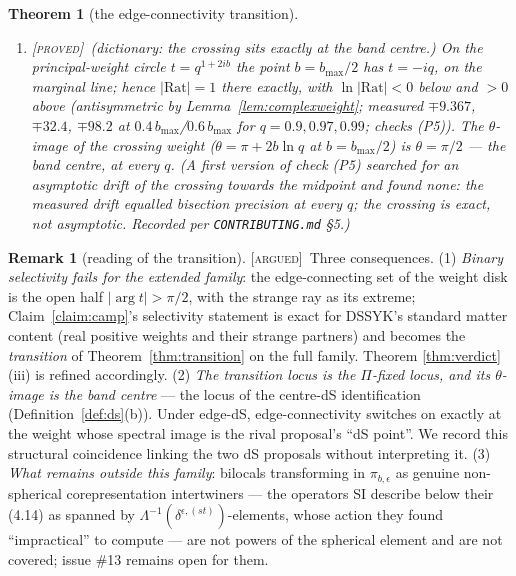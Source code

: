 \documentclass[11pt,a4paper]{article}
\newcommand{\PROVED}{{\color{ForestGreen}\textsc{[proved]}}}
\newcommand{\ARGUED}{{\color{orange}\textsc{[argued]}}}
\theoremstyle{definition}
\newtheorem{remark}[definition]{Remark}
\theoremstyle{plain}
\newtheorem{theorem}[definition]{Theorem}
\begin{document}
\begin{theorem}[the edge-connectivity transition]
\begin{enumerate}[label=(\roman*)]
equal modulus factor by factor. (Verified to $5\times10^{-41}$; checks (P4).)
\item \PROVED\ \emph{(dictionary: the crossing sits exactly at the band centre.)} On the
principal-weight circle $t=q^{1+2ib}$ the point $b=b_{\max}/2$ has $t=-iq$, on the marginal
line; hence $|\mathrm{Rat}|=1$ there \emph{exactly}, with
$\ln|\mathrm{Rat}|<0$ below and $>0$ above (antisymmetric by
Lemma~\ref{lem:complexweight}; measured $\mp9.367$, $\mp32.4$, $\mp98.2$ at
$0.4\,b_{\max}$/$0.6\,b_{\max}$ for $q=0.9,0.97,0.99$; checks (P5)). The $\theta$-image of
the crossing weight ($\theta=\pi+2b\ln q$ at $b=b_{\max}/2$) is
$\theta=\pi/2$ --- \emph{the band centre, at every $q$}. (A first version of check (P5)
searched for an asymptotic drift of the crossing towards the midpoint and found none:
the measured drift equalled bisection precision at every $q$; the crossing is exact,
not asymptotic. Recorded per \texttt{CONTRIBUTING.md} \S5.)
\end{enumerate}
\end{theorem}

\begin{remark}[reading of the transition]\label{rem:transitionreading}
\ARGUED\ Three consequences.
(1) \emph{Binary selectivity fails for the extended family}: the edge-connecting set of
the weight disk is the open half $|\arg t|>\pi/2$, with the strange ray as its extreme;
Claim~\ref{claim:camp}'s selectivity statement is exact for DSSYK's standard matter
content (real positive weights and their strange partners) and becomes the
\emph{transition} of Theorem~\ref{thm:transition} on the full family. Theorem
\ref{thm:verdict}(iii) is refined accordingly.
(2) \emph{The transition locus is the $\Pi$-fixed locus, and its $\theta$-image is the
band centre} --- the locus of the centre-dS identification
(Definition~\ref{def:ds}(b)). Under edge-dS, edge-connectivity switches on exactly at the
weight whose spectral image is the rival proposal's ``dS point''. We record this
structural coincidence linking the two dS proposals without interpreting it.
(3) \emph{What remains outside this family}: bilocals transforming in $\pi_{b,\epsilon}$
as genuine non-spherical corepresentation intertwiners --- the operators SI describe
below their (4.14) as spanned by $\Lambda^{-1}(\delta^{\epsilon,(st)})$-elements, whose
action they found ``impractical'' to compute --- are not powers of the spherical element
and are not covered; issue \#13 remains open for them.
\end{remark}
\end{document}
